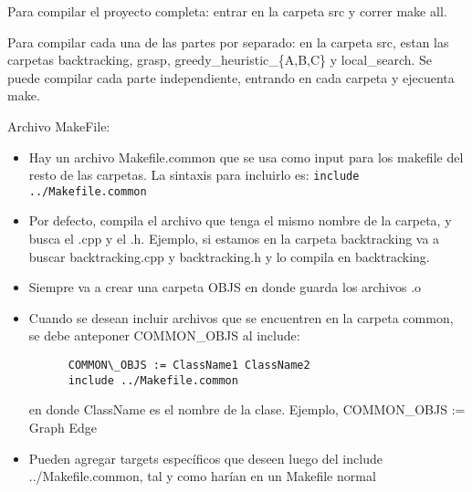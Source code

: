 
Para compilar el proyecto completa: entrar en la carpeta src y correr make all.

Para compilar cada una de las partes por separado: en la carpeta src, estan las carpetas backtracking, grasp, greedy\_heuristic\_\{A,B,C\} y local\_search. Se puede compilar cada parte independiente, entrando en cada carpeta y ejecuenta make. 

Archivo MakeFile:

\begin{itemize}
  \item Hay un archivo Makefile.common que se usa como input para los makefile del resto de las carpetas.
  La sintaxis para incluirlo es: \texttt{include ../Makefile.common}
  
  \item Por defecto, compila el archivo que tenga el mismo nombre de la carpeta, y busca el .cpp y el .h.
	  Ejemplo, si estamos en la carpeta backtracking va a buscar backtracking.cpp y backtracking.h y lo compila en backtracking.
	  
  \item Siempre va a crear una carpeta OBJS en donde guarda los archivos .o
  
  \item Cuando se desean incluir archivos que se encuentren en la carpeta common, se debe anteponer COMMON\_OBJS al include:
  
  \begin{verbatim}
      COMMON\_OBJS := ClassName1 ClassName2
      include ../Makefile.common
  \end{verbatim}
  
  en donde ClassName es el nombre de la clase. Ejemplo, COMMON\_OBJS := Graph Edge

  \item Pueden agregar targets específicos que deseen luego del include ../Makefile.common, tal y como harían en un Makefile normal
  
\end{itemize}